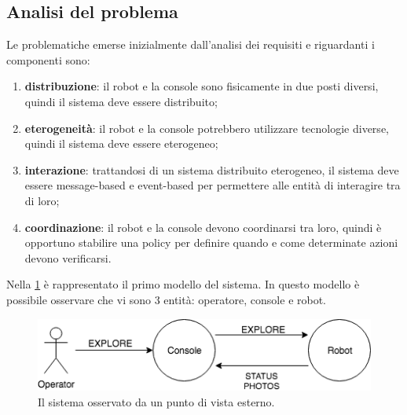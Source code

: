 \subsection{Analisi del problema}

Le problematiche emerse inizialmente dall'analisi dei requisiti e riguardanti i componenti sono:

\begin{enumerate}
\item  \textbf{distribuzione}: il robot e la console sono fisicamente in due posti diversi, quindi il sistema deve essere distribuito;
\item \textbf{eterogeneità}: il robot e la console potrebbero utilizzare tecnologie diverse, quindi il sistema deve essere eterogeneo;
\item \textbf{interazione}: trattandosi di un sistema distribuito eterogeneo, il sistema deve essere message-based e event-based per permettere alle entità di interagire tra di loro;
\item \textbf{coordinazione}: il robot e la console devono coordinarsi tra loro, quindi è opportuno stabilire una policy per definire quando e come determinate azioni devono verificarsi.
\end{enumerate}

Nella \cref{fig:system_external_view} è rappresentato il primo modello del sistema. In questo modello è possibile osservare che vi sono 3 entità: operatore, console e robot.

\begin{figure} [H]
\includegraphics[width=\linewidth]{img/sprint0/system_external_view.png}
\caption{Il sistema osservato da un punto di vista esterno.}
\label{fig:system_external_view}
\end{figure}

